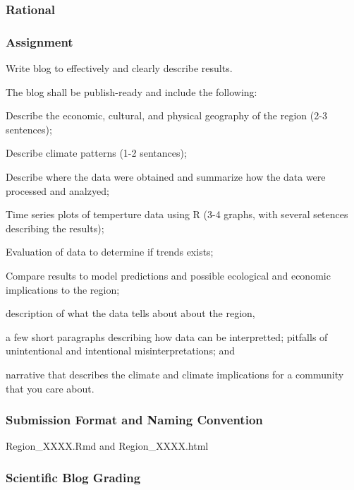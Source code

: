 
\subsubsection{Rational}

\subsubsection{Assignment}

Write blog to effectively and clearly describe results.

The blog shall be publish-ready and include the following: 

\begin{itemize*}
  \item Describe the economic, cultural, and physical geography of the region (2-3 sentences);
  \item Describe climate patterns (1-2 sentances);
  \item Describe where the data were obtained and summarize how the data were processed and analzyed;
  \item Time series plots of temperture data using R (3-4 graphs, with several setences describing the results);
  \item Evaluation of data to determine if trends exists;
  \item Compare results to model predictions and possible ecological and economic implications to the region; 
    \item description of what the data tells about about the region, 
  \item a few short paragraphs describing how data can be interpretted; pitfalls of unintentional and intentional misinterpretations; and 
  \item narrative that describes the climate and climate implications for a community that you care about.
\end{itemize*}

\subsubsection{Submission Format and Naming Convention}

Region\_XXXX.Rmd and Region\_XXXX.html

\subsubsection{Scientific Blog Grading}

